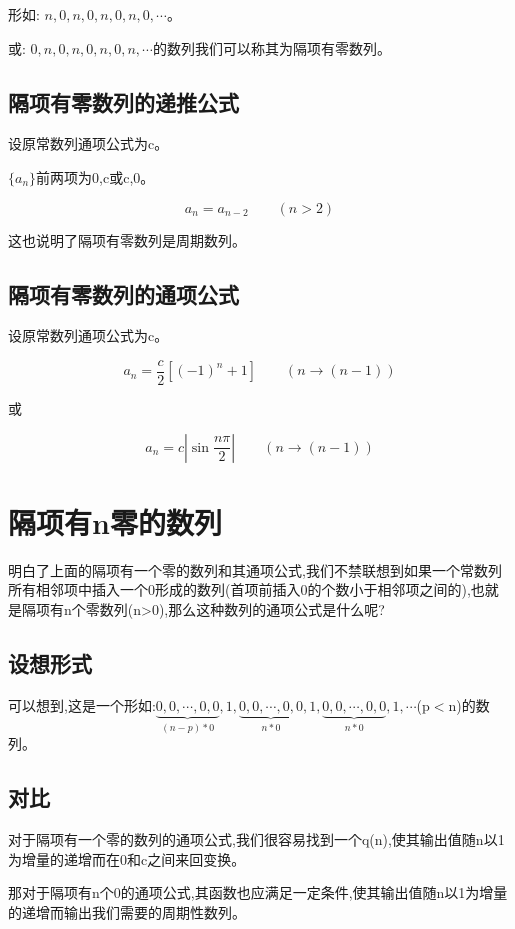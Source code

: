 \documentclass[final,3p,times,onecolumn]{elsarticle}
\begin{document}
形如: $n,0,n,0,n,0,n,0,\cdots$。

或: $0,n,0,n,0,n,0,n,\cdots$的数列我们可以称其为隔项有零数列。

\subsection{隔项有零数列的递推公式}

设原常数列通项公式为c。

$\{a_n\}$前两项为0,c或c,0。

$$a_n=a_{n-2}\qquad(n>2)$$

这也说明了隔项有零数列是周期数列。

\subsection{隔项有零数列的通项公式}

设原常数列通项公式为c。

$$a_n=\frac{c}{2}[(-1)^n+1]\qquad(n\rightarrow(n-1))$$

或

$$a_n=c|\sin\frac{n\pi}{2}|\qquad(n\rightarrow(n-1))$$

\section{隔项有n零的数列}

明白了上面的隔项有一个零的数列和其通项公式,我们不禁联想到如果一个常数列所有相邻项中插入一个0形成的数列(首项前插入0的个数小于相邻项之间的),也就是隔项有n个零数列(n>0),那么这种数列的通项公式是什么呢?

\subsection{设想形式}

可以想到,这是一个形如:$\underbrace{0,0,\cdots,0,0}_{(n-p)*0},1,\underbrace{0,0,\cdots,0,0}_{n*0},1,\underbrace{0,0,\cdots,0,0}_{n*0},1,\cdots$(p$<$n)的数列。

\subsection{对比}

对于隔项有一个零的数列的通项公式,我们很容易找到一个q(n),使其输出值随n以1为增量的递增而在0和c之间来回变换。

那对于隔项有n个0的通项公式,其函数也应满足一定条件,使其输出值随n以1为增量的递增而输出我们需要的周期性数列。
\end{document}
